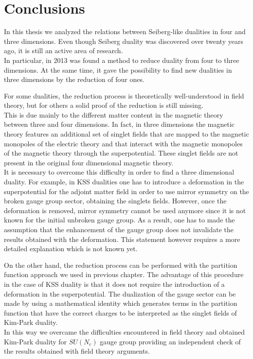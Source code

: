 \chapter*{Conclusions}
\pagestyle{conclusion}

In this thesis we analyzed the relations between Seiberg-like dualities in four and three dimensions. 
Even though Seiberg duality was discovered over twenty years ago, it is still an active area of research.\\
In particular, in 2013 was found a method to reduce duality from four to three dimensions.
At the same time, it gave the possibility to find new dualities in three dimensions by the reduction of four ones.

For some dualities, the reduction process is theoretically well-understood in field theory, but for others a solid proof of the reduction is still missing.\\
This is due mainly to the different matter content in the magnetic theory between three and four dimensions.
In fact, in three dimensions the magnetic theory features an additional set of singlet fields that are mapped to the magnetic monopoles of the electric theory and that interact with the magnetic monopoles of the magnetic theory through the superpotential.
These singlet fields are not present in the original four dimensional magnetic theory.
\\
It is necessary to overcome this difficulty in order to find a three dimensional duality.
For example, in KSS dualities one has to introduce a deformation in the superpotential for the adjoint matter field in order to use mirror symmetry on the broken gauge group sector, obtaining the singlets fields. 
However, once the deformation is removed, mirror symmetry cannot be used anymore since it is not known for the initial unbroken gauge group.
As a result, one has to made the assumption that the enhancement of the
gauge group does not invalidate the results obtained with the deformation. 
This statement however requires a more detailed explanation which is not known yet.

On the other hand, the reduction process can be performed with the partition function approach we used in previous chapter. 
The advantage of this procedure in the case of KSS duality is that it does not require the introduction of a deformation in the superpotential.
The dualization of the gauge sector can be made by using a mathematical identity which generates terms in the partition function that have the correct charges to be interpreted as the singlet fields of Kim-Park duality.\\
In this way we overcame the difficulties encountered in field theory and obtained Kim-Park duality for $SU(N_c)$ gauge group providing an independent check of the results obtained with field theory arguments.


